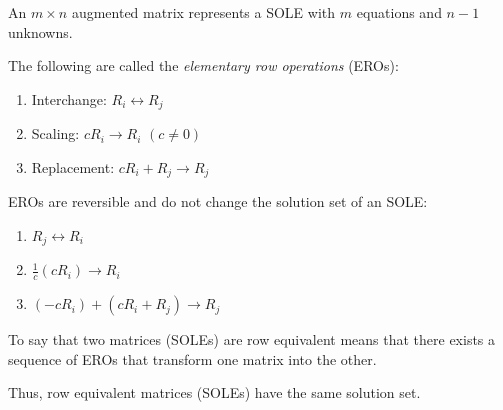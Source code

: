 \documentclass[letterpaper,12pt,fleqn]{article}
\begin{document}
An $m\times n$ augmented matrix represents a SOLE with $m$ equations and
$n-1$ unknowns.

\begin{definition}
The following are called the \emph{elementary row operations} (EROs):
\begin{enumerate}
\item Interchange: $R_i\leftrightarrow R_j$
\item Scaling: $cR_i\rightarrow R_i$ $(c\ne0)$
\item Replacement: $cR_i+R_j\rightarrow R_j$
\end{enumerate}
\end{definition}

EROs are reversible and do not change the solution set of an SOLE:
\begin{enumerate}
\item $R_j\leftrightarrow R_i$
\item $\frac{1}{c}(cR_i)\rightarrow R_i$
\item $(-cR_i)+(cR_i+R_j)\rightarrow R_j$
\end{enumerate}

\begin{definition}
  To say that two matrices (SOLEs) are row equivalent means that there exists
  a sequence of EROs that transform one matrix into the other.

  Thus, row equivalent matrices (SOLEs) have the same solution set.
\end{definition}
\end{document}
